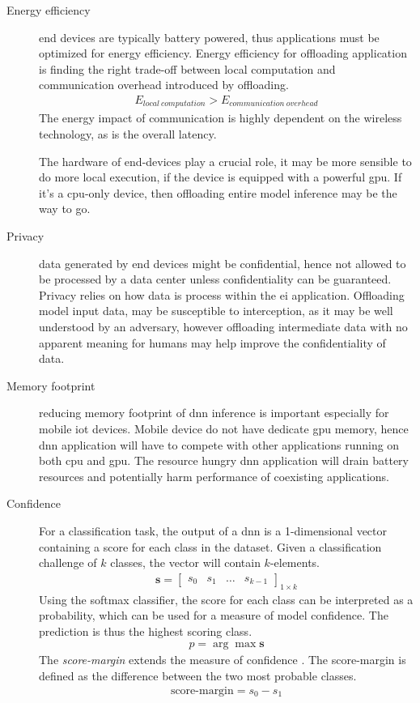 \begin{description}
	\item[Energy efficiency] end devices are typically battery powered, thus applications must be optimized for energy efficiency. Energy efficiency for offloading application is finding the right trade-off between local computation and communication overhead introduced by offloading. 
	\begin{align*}
	E_{local\: computation} > E_{communication\: overhead}
	\end{align*}
	The energy impact of communication is highly dependent on the wireless technology, as is the overall latency. 
	
	The hardware of end-devices play a crucial role, it may be more sensible to do more local execution, if the device is equipped with a powerful \gls{gpu}. If it's a \gls{cpu}-only device, then offloading entire model inference may be the way to go.
	
	\item[Privacy] data generated by end devices might be confidential, hence not allowed to be processed by a data center unless confidentiality can be guaranteed. Privacy relies on how data is process within the \gls{ei} application. Offloading model input data, may be susceptible to interception, as it may be well understood by an adversary, however offloading intermediate data with no apparent meaning for humans may help improve the confidentiality of data.    
	
	\item[Memory footprint] reducing memory footprint of \gls{dnn} inference is important especially for mobile \gls{iot} devices. Mobile device do not have dedicate \gls{gpu} memory, hence \gls{dnn} application will have to compete with other applications running on both \gls{cpu} and \gls{gpu}. The resource hungry \gls{dnn} application will drain battery resources and potentially harm performance of coexisting applications. 
	
	\item[Confidence] For a classification task, the output of a \gls{dnn} is a 1-dimensional vector containing a score for each class in the dataset. Given a classification challenge of $k$ classes, the vector will contain $k$-elements.
	\begin{align*}
	\mathbf{s} = \begin{bmatrix}
	s_0 & s_1 & \dots & s_{k-1}
	\end{bmatrix}_{1 \times k}
	\end{align*}
	Using the softmax classifier, the score for each class can be interpreted as a probability, which can be used for a measure of model confidence. The prediction is thus the highest scoring class. 
	\begin{align*}
	p = \arg\max \mathbf{s}
	\end{align*}
	The \emph{score-margin} extends the measure of confidence \cite{park_big/little_2015}. The score-margin is defined as the difference between the two most probable classes. 
	\begin{align*}
	\mathrm{\text{score-margin}} = s_0 - s_1
	\end{align*}
	

\end{description}
